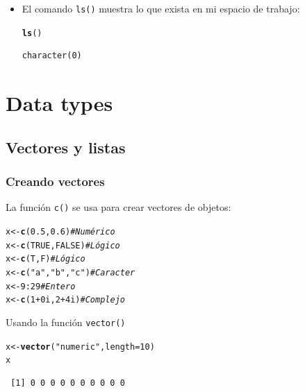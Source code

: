 \documentclass{article}\usepackage[]{graphicx}\usepackage[]{color}
\makeatletter
\newcommand{\hlnum}[1]{\textcolor[rgb]{0.686,0.059,0.569}{#1}}%
\newcommand{\hlstr}[1]{\textcolor[rgb]{0.192,0.494,0.8}{#1}}%
\newcommand{\hlcom}[1]{\textcolor[rgb]{0.678,0.584,0.686}{\textit{#1}}}%
\newcommand{\hlopt}[1]{\textcolor[rgb]{0,0,0}{#1}}%
\newcommand{\hlstd}[1]{\textcolor[rgb]{0.345,0.345,0.345}{#1}}%
\newcommand{\hlkwb}[1]{\textcolor[rgb]{0.69,0.353,0.396}{#1}}%
\newcommand{\hlkwc}[1]{\textcolor[rgb]{0.333,0.667,0.333}{#1}}%
\newcommand{\hlkwd}[1]{\textcolor[rgb]{0.737,0.353,0.396}{\textbf{#1}}}%
\newenvironment{kframe}{%
 \def\at@end@of@kframe{}%
 \ifinner\ifhmode%
  \def\at@end@of@kframe{\end{minipage}}%
  \begin{minipage}{\columnwidth}%
 \fi\fi%
 \def\FrameCommand##1{\hskip\@totalleftmargin \hskip-\fboxsep
 \colorbox{shadecolor}{##1}\hskip-\fboxsep
     \hskip-\linewidth \hskip-\@totalleftmargin \hskip\columnwidth}%
 \MakeFramed {\advance\hsize-\width
   \@totalleftmargin\z@ \linewidth\hsize
   \@setminipage}}%
 {\par\unskip\endMakeFramed%
 \at@end@of@kframe}
\newenvironment{knitrout}{}{} %
\makeatother
\begin{document}
\begin{itemize}
  \item El comando \texttt{ls()} muestra lo que exista en mi espacio de trabajo:
\begin{knitrout}
\color{fgcolor}\begin{kframe}
\begin{alltt}
  \hlkwd{ls}\hlstd{()}
\end{alltt}
\begin{verbatim}
character(0)
\end{verbatim}
\end{kframe}
\end{knitrout}
\end{itemize}

\section{Data types}
  \subsection{Vectores y listas}
    \subsubsection{Creando vectores}
      La función \texttt{c()} se usa para crear vectores de objetos:
\begin{knitrout}
\color{fgcolor}\begin{kframe}
\begin{alltt}
  \hlstd{x} \hlkwb{<-} \hlkwd{c}\hlstd{(}\hlnum{0.5}\hlstd{,} \hlnum{0.6}\hlstd{)}      \hlcom{# Numérico}
  \hlstd{x} \hlkwb{<-} \hlkwd{c}\hlstd{(}\hlnum{TRUE}\hlstd{,} \hlnum{FALSE}\hlstd{)}   \hlcom{# Lógico}
  \hlstd{x} \hlkwb{<-} \hlkwd{c}\hlstd{(T, F)}          \hlcom{# Lógico}
  \hlstd{x} \hlkwb{<-} \hlkwd{c}\hlstd{(}\hlstr{"a"}\hlstd{,} \hlstr{"b"}\hlstd{,}\hlstr{"c"}\hlstd{)}  \hlcom{# Caracter}
  \hlstd{x} \hlkwb{<-} \hlnum{9}\hlopt{:}\hlnum{29}             \hlcom{# Entero}
  \hlstd{x} \hlkwb{<-} \hlkwd{c}\hlstd{(}\hlnum{1}\hlopt{+}\hlnum{0i}\hlstd{,} \hlnum{2}\hlopt{+}\hlnum{4i}\hlstd{)}    \hlcom{# Complejo}
\end{alltt}
\end{kframe}
\end{knitrout}

      Usando la función \texttt{vector()}
\begin{knitrout}
\color{fgcolor}\begin{kframe}
\begin{alltt}
  \hlstd{x} \hlkwb{<-} \hlkwd{vector}\hlstd{(}\hlstr{"numeric"}\hlstd{,} \hlkwc{length} \hlstd{=} \hlnum{10}\hlstd{)}
  \hlstd{x}
\end{alltt}
\begin{verbatim}
 [1] 0 0 0 0 0 0 0 0 0 0
\end{verbatim}
\end{kframe}
\end{knitrout}
\end{document}
